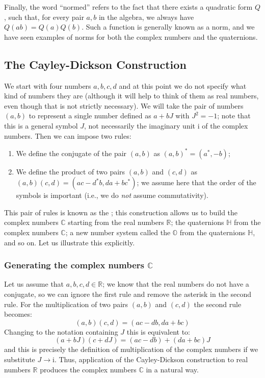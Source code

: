Finally, the word ``normed'' refers to the fact that there exists a quadratic form $Q$, such that, for every pair $a,b$ in the algebra, we always have $Q(ab)=Q(a)Q(b)$. Such a function is generally known as a norm, and we have seen examples of norms for both the complex numbers and the quaternions.


\subsection{The Cayley-Dickson Construction}


We start with four numbers $a, b, c, d$ and at this point we do not specify what kind of numbers they are (although it will help to think of them as real numbers, even though that is not strictly necessary).  We will take the pair of numbers $(a,b)$ to represent a single number defined as $a+bJ$ with $J^2=-1$; note that this is a general symbol $J$, not necessarily the imaginary unit $\mathrm{i}$ of the complex numbers. Then we can impose two rules:

\begin{enumerate}
\item We define the conjugate of the pair $(a,b)$ as $(a,b)^{\ast}=(a^{\ast},-b)$;
\item We define the product of two pairs $(a,b)$ and $(c,d)$ as 	$(a,b)(c,d)=( ac-d^{\ast}b, da+bc^{\ast} )$; we assume here that the order of the symbols is important (i.e., we do \textit{not} assume commutativity).
\end{enumerate}

\noindent This pair of rules is known as the ; this construction allows us to build the complex numbers $\mathbb{C}$ starting from the real numbers $\mathbb{R}$; the quaternions $\mathbb{H}$ from the complex numbers $\mathbb{C}$; a new number system called the  $\mathbb{O}$ from the quaternions $\mathbb{H}$, and so on. Let us illustrate this explicitly.

\subsubsection{Generating the complex numbers $\mathbb{C}$}
Let us assume that $a,b,c,d \in\mathbb{R}$; we know that the real numbers do not have a conjugate, so we can ignore the first rule and remove the asterisk in the second rule. For the multiplication of two pairs $(a,b)$ and $(c,d)$ the second rule becomes:
\begin{equation}
	(a,b)(c,d) = (ac-db,da+bc)
\end{equation}
Changing to the notation containing $J$ this is equivalent to:
\begin{equation}
	(a+bJ)(c+dJ) = (ac-db) + (da+bc)J
\end{equation}
and this is precisely the definition of multiplication of the complex numbers if we substitute $J\rightarrow \mathrm{i}$.  Thus, application of the Cayley-Dickson construction to real numbers $\mathbb{R}$ produces the complex numbers $\mathbb{C}$ in a natural way.

